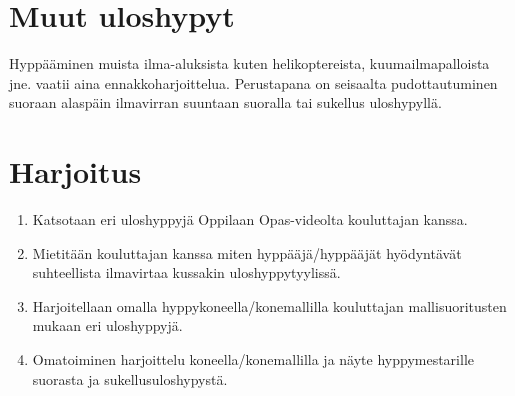 \section{ Muut uloshypyt }
\label{uloshyppytyylit-muut-uloshypyt}


Hyppääminen muista ilma-aluksista kuten helikoptereista, kuumailmapalloista jne. vaatii aina ennakkoharjoittelua. Perustapana on seisaalta pudottautuminen suoraan alaspäin ilmavirran suuntaan suoralla tai sukellus uloshypyllä. 

\section{ Harjoitus }
\label{uloshyppytyylit-harjoitus}

\begin{enumerate}[label=\bfseries \arabic*)]
\item  Katsotaan eri uloshyppyjä Oppilaan Opas-videolta kouluttajan kanssa. 
\item  Mietitään kouluttajan kanssa miten hyppääjä/hyppääjät hyödyntävät suhteellista ilmavirtaa kussakin uloshyppytyylissä. 
\item  Harjoitellaan omalla hyppykoneella/konemallilla kouluttajan mallisuoritusten mukaan eri uloshyppyjä. 
\item  Omatoiminen harjoittelu koneella/konemallilla ja näyte hyppymestarille suorasta ja sukellusuloshypystä. 
\end{enumerate}
